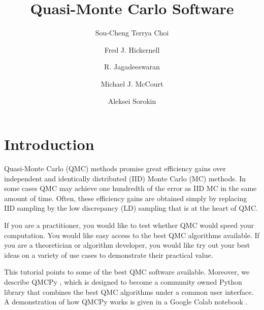 \documentclass[graybox,footinfo]{svmult}
\begin{document}
\title*{Quasi-Monte Carlo Software}
\author{Sou-Cheng Terrya Choi \and Fred J. Hickernell \and R. Jagadeeswaran \and Michael J. McCourt \and Aleksei Sorokin}

\maketitle




\section{Introduction}
Quasi-Monte Carlo (QMC) methods promise great efficiency gains over independent and identically distributed (IID) Monte Carlo (MC) methods.  In some cases QMC may achieve one hundredth of the error as IID MC in the same amount of time. Often, these efficiency gains are obtained simply by  replacing IID sampling by the low discrepancy (LD) sampling that is at the heart of QMC. 

If you are a practitioner, you would like to test whether QMC would speed your computation.  You would like easy access to the best QMC algorithms available.  If you are a theoretician or algorithm developer, you would like try out your best ideas on a variety of use cases to demonstrate their practical value.  

This tutorial points to some of the best QMC software available.  Moreover, we describe QMCPy \cite{QMCPy2020a}, which is designed to become a community owned Python library that combines the best QMC algorithms under a common user interface.  A demonstration of how QMCPy works is given in a Google Colab notebook \cite{QMCPyTutColab2020}.
\end{document}

